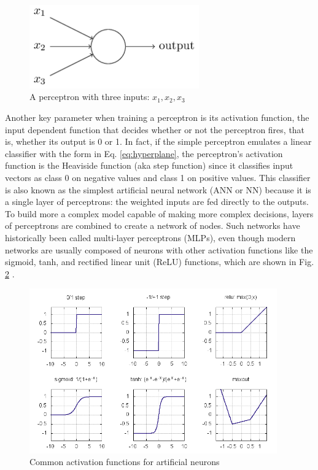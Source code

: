 \begin{figure}[h]
\centering
\captionsetup{justification=centering,width=0.95\textwidth}
\centerline{\includegraphics[width=0.65\textwidth]{perceptron.png}}
\caption[Perceptron Model] {
    A perceptron with three inputs: $x_{1}, x_{2}, x_{3}$ \cite{perceptron}
}
\label{fig:perceptron}
\end{figure}


Another key parameter when training a perceptron is its activation function, the input dependent function that decides whether or not the perceptron fires, that is, whether its output is 0 or 1.  In fact, if the simple perceptron emulates a linear classifier with the form in Eq. \ref{eq:hyperplane}, the perceptron's activation function is the Heaviside function (aka step function) since it classifies input vectors as class 0 on negative values and class 1 on positive values.  This classifier is also known as the simplest artificial neural network (ANN or NN) because it is a single layer of perceptrons: the weighted inputs are fed directly to the outputs.  To build more a complex model capable of making more complex decisions, layers of perceptrons are combined to create a network of nodes.  Such networks have historically been called multi-layer perceptrons (MLPs), even though modern networks are usually composed of neurons with other activation functions like the sigmoid, tanh, and rectified linear unit (ReLU) functions, which are shown in Fig. \ref{fig:activationFn} \cite{neuralNetsNLP}.


\begin{figure}[h]
\centering
\captionsetup{justification=centering,width=0.95\textwidth}
\centerline{\includegraphics[width=0.95\textwidth]{activationFn.png}}
\caption[Activation Functions]{
    Common activation functions for artificial neurons \cite{activationFn}
}
\label{fig:activationFn}
\end{figure}


